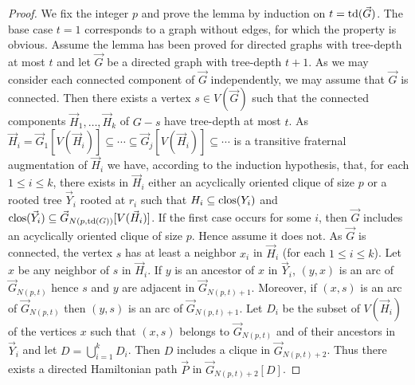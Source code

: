 \documentclass[a4paper]{amsart}
\theoremstyle{definition}
\theoremstyle{remark}
\DeclareMathOperator\depth{{\rm td}}
\DeclareMathOperator\clos{{\rm clos}}
\def\vG{\vec{G}}
\def\vH{\vec{H}}
\def\vP{\vec{P}}
\def\vY{\vec{Y}}
\begin{document}
\begin{proof}
We fix the integer $p$ and prove the lemma by induction on $t=\depth(\vG)$.
The base case $t=1$ corresponds to a graph without edges, for which
the property is obvious. Assume the lemma has been proved for directed
graphs with tree-depth at most $t$ and let $\vG$ be a directed graph
with tree-depth $t+1$. As we may consider each connected component of
$\vG$ independently, we may assume that $\vG$ is connected. Then there
exists a vertex $s\in V(\vG)$ such that the connected components
$\vH_1,\dotsc,\vH_k$ of $G-s$ have tree-depth at most $t$. As
$\vH_i=\vG_1[V(\vH_i)]\subseteq\dotsb\subseteq\vG_j[V(\vH_i)]\subseteq\dotsb$ is a transitive fraternal
augmentation of $\vH_i$ we have, according to the induction
hypothesis, that, for each $1\leq i\leq k$, there exists in $\vH_i$
either an acyclically oriented clique of size $p$ or a rooted tree
$\vY_i$ rooted at $r_i$ such that $H_i\subseteq\clos(Y_i)$
and $\clos(\vY_i)\subseteq\vG_{N(p,\depth(G))}[V(\vH_i)]$. If the
first case occurs for some $i$, then $\vG$ includes an acyclically
oriented clique of size $p$. Hence assume it does not. As $\vG$ is
connected, the vertex $s$ has at least a neighbor $x_i$ in $\vH_i$
(for each $1\leq i\leq k$). Let $x$ be any neighbor of $s$ in
$\vH_i$. If $y$ is an ancestor of $x$ in $\vY_i$, 
$(y,x)$ is an arc of $\vG_{N(p,t)}$ hence $s$ and $y$ are
adjacent in $\vG_{N(p,t)+1}$. Moreover, if $(x,s)$ is an arc of
$\vG_{N(p,t)}$ then $(y,s)$ is an arc of $\vG_{N(p,t)+1}$. Let $D_i$
be the subset of $V(\vH_i)$ of the vertices $x$ such that $(x,s)$
belongs to $\vG_{N(p,t)}$ and of their ancestors in $\vY_i$ and let
$D=\bigcup_{i=1}^k D_i$. Then $D$ includes a clique in
$\vG_{N(p,t)+2}$. Thus there exists a
directed Hamiltonian path $\vP$ in $\vG_{N(p,t)+2}[D]$.


\end{proof}
\end{document}
